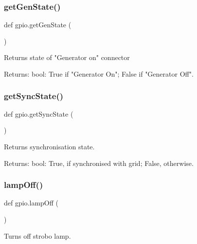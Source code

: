 \subsubsection{\texorpdfstring{get\+Gen\+State()}{getGenState()}}
{\footnotesize\ttfamily def gpio.\+get\+Gen\+State (\begin{DoxyParamCaption}{ }\end{DoxyParamCaption})}

\begin{DoxyVerb}Returns state of "Generator on" connector

Returns:
    bool: True if "Generator On"; False if "Generator Off".\end{DoxyVerb}
 \mbox{\label{namespacegpio_a9c9f91a0ba0db143b9200a036e9fb52d}} 
\subsubsection{\texorpdfstring{get\+Sync\+State()}{getSyncState()}}
{\footnotesize\ttfamily def gpio.\+get\+Sync\+State (\begin{DoxyParamCaption}{ }\end{DoxyParamCaption})}

\begin{DoxyVerb}Returns synchronisation state.

Returns:
    bool: True, if synchronised with grid; False, otherwise.\end{DoxyVerb}
 \mbox{\label{namespacegpio_aff3c5777645844a7f11e1825230c29b4}} 
\subsubsection{\texorpdfstring{lamp\+Off()}{lampOff()}}
{\footnotesize\ttfamily def gpio.\+lamp\+Off (\begin{DoxyParamCaption}{ }\end{DoxyParamCaption})}

\begin{DoxyVerb}Turns off strobo lamp.
\end{DoxyVerb}
 \mbox{\label{namespacegpio_a5dcd80a4a013b954caedb5318d1e97f4}} 
